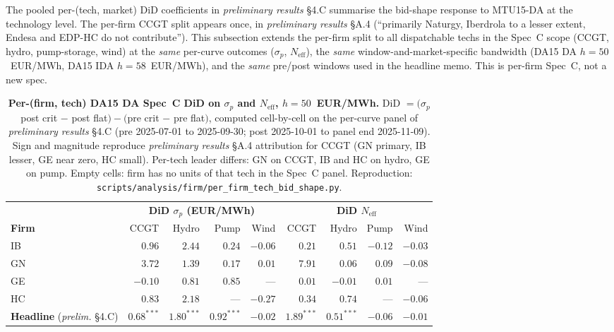 \documentclass[11pt,a4paper]{article}
\begin{document}
\noindent The pooled per-(tech, market) DiD coefficients in
\emph{preliminary results} \S 4.C summarise the bid-shape response
to MTU15-DA at the technology level. The per-firm CCGT split
appears once, in \emph{preliminary results} \S A.4 (``primarily
Naturgy, Iberdrola to a lesser extent, Endesa and EDP-HC do not
contribute''). This subsection extends the per-firm split to all
dispatchable techs in the Spec~C scope (CCGT, hydro, pump-storage,
wind) at the \emph{same} per-curve outcomes ($\sigma_p$,
$N_{\text{eff}}$), the \emph{same} window-and-market-specific
bandwidth (DA15 DA $h = 50$~EUR/MWh, DA15 IDA $h = 58$~EUR/MWh),
and the \emph{same} pre/post windows used in the headline memo.
This is per-firm Spec~C, not a new spec.

\begin{table}[H]
\centering\footnotesize
\caption{\textbf{Per-(firm, tech) DA15 DA Spec~C DiD on $\sigma_p$ and
$N_{\text{eff}}$, $h = 50$~EUR/MWh.} DiD $= (\sigma_p$ post crit
$- $ post flat$) - ($pre crit $-$ pre flat$)$, computed cell-by-cell
on the per-curve panel of \emph{preliminary results} \S 4.C
(pre 2025-07-01 to 2025-09-30; post 2025-10-01 to panel end
2025-11-09). Sign and magnitude reproduce \emph{preliminary results}
\S A.4 attribution for CCGT (GN primary, IB lesser, GE near zero,
HC small). Per-tech leader differs: GN on CCGT, IB and HC on hydro,
GE on pump. Empty cells: firm has no units of that tech in the
Spec~C panel. Reproduction:
\texttt{scripts/analysis/firm/per\_firm\_tech\_bid\_shape.py}.}
\label{tab:per_firm_tech_specc}
\setlength{\tabcolsep}{5pt}
\begin{tabular}{l r r r r | r r r r}
\toprule
        & \multicolumn{4}{c}{\textbf{DiD $\sigma_p$ (EUR/MWh)}} & \multicolumn{4}{c}{\textbf{DiD $N_{\text{eff}}$}} \\
\cmidrule(lr){2-5} \cmidrule(lr){6-9}
\textbf{Firm} & CCGT & Hydro & Pump & Wind & CCGT & Hydro & Pump & Wind \\
\midrule
IB    & $0.96$         & \textbf{$2.44$} & $0.24$         & $-0.06$ & $0.21$ & $0.51$ & $-0.12$ & $-0.03$ \\
GN    & \textbf{$3.72$} & $1.39$         & $0.17$         & $0.01$ & \textbf{$7.91$} & $0.06$ & $0.09$ & $-0.08$ \\
GE    & $-0.10$         & $0.81$         & \textbf{$0.85$} & ---     & $0.01$ & $-0.01$ & $0.01$ & ---     \\
HC    & $0.83$         & \textbf{$2.18$} & ---             & $-0.27$ & $0.34$ & $0.74$ & ---     & $-0.06$ \\
\midrule
\textbf{Headline} (\emph{prelim.} \S 4.C) & \textbf{$0.68^{***}$} & \textbf{$1.80^{***}$} & \textbf{$0.92^{***}$} & \textbf{$-0.02$} & \textbf{$1.89^{***}$} & \textbf{$0.51^{***}$} & $-0.06$ & $-0.01$ \\
\bottomrule
\end{tabular}
\end{table}
\end{document}
